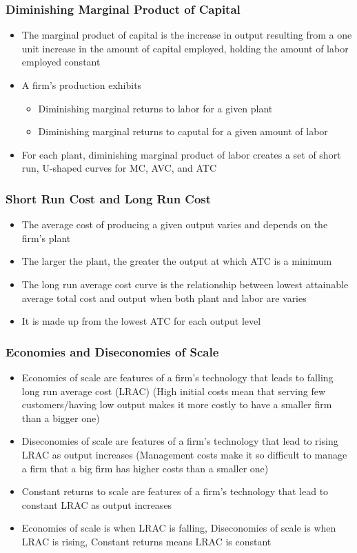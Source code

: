 \documentclass[11pt]{article}
\begin{document}
\subsubsection{Diminishing Marginal Product of Capital}
\label{sec:org93b21d6}
\begin{itemize}
\item The marginal product of capital is the increase in output resulting from a one unit increase in the amount of capital employed, holding the amount of labor employed constant
\item A firm's production exhibits
\begin{itemize}
\item Diminishing marginal returns to labor for a given plant
\item Diminishing marginal returns to caputal for a given amount of labor
\end{itemize}
\item For each plant, diminishing marginal product of labor creates a set of short run, U-shaped curves for MC, AVC, and ATC
\end{itemize}
\subsubsection{Short Run Cost and Long Run Cost}
\label{sec:orgda63e3d}
\begin{itemize}
\item The average cost of producing a given output varies and depends on the firm's plant
\item The larger the plant, the greater the output at which ATC is a minimum
\item The long run average cost curve is the relationship between lowest attainable average total cost and output when both plant and labor are varies
\item It is made up from the lowest ATC for each output level
\end{itemize}
\subsubsection{Economies and Diseconomies of Scale}
\label{sec:org6ad9eb6}
\begin{itemize}
\item Economies of scale are features of a firm's technology that leads to falling long run average cost (LRAC) (High initial costs mean that serving few customers/having low output makes it more costly to have a smaller firm than a bigger one)
\item Diseconomies of scale are features of a firm's technology that lead to rising LRAC as output increases (Management costs make it so difficult to manage a firm that a big firm has higher costs than a smaller one)
\item Constant returns to scale are features of a firm's technology that lead to constant LRAC as output increases
\item Economies of scale is when LRAC is falling, Diseconomies of scale is when LRAC is rising, Constant returns means LRAC is constant
\end{itemize}
\end{document}
